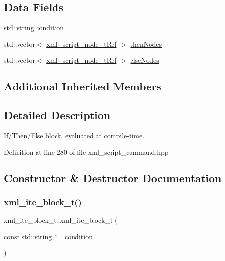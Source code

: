 \subsection*{Data Fields}
\begin{DoxyCompactItemize}
\item 
std\+::string \hyperlink{classxml__ite__block__t_ad7d8d5a0321dac3cc6e74e55411665f2}{condition}
\item 
std\+::vector$<$ \hyperlink{xml__script__command_8hpp_a1fe3d50ade66bc35e41be9b68bbbcd02}{xml\+\_\+script\+\_\+node\+\_\+t\+Ref} $>$ \hyperlink{classxml__ite__block__t_add9208d8134ef496e5162efb73f89db3}{then\+Nodes}
\item 
std\+::vector$<$ \hyperlink{xml__script__command_8hpp_a1fe3d50ade66bc35e41be9b68bbbcd02}{xml\+\_\+script\+\_\+node\+\_\+t\+Ref} $>$ \hyperlink{classxml__ite__block__t_a785fdef43d80828f6e2c3424fe8dec46}{else\+Nodes}
\end{DoxyCompactItemize}
\subsection*{Additional Inherited Members}


\subsection{Detailed Description}
If/\+Then/\+Else block, evaluated at compile-\/time. 

Definition at line 280 of file xml\+\_\+script\+\_\+command.\+hpp.



\subsection{Constructor \& Destructor Documentation}
\mbox{\label{classxml__ite__block__t_a57afc4e1f0e0a6aa1b5441c96166f8eb}} 
\subsubsection{\texorpdfstring{xml\+\_\+ite\+\_\+block\+\_\+t()}{xml\_ite\_block\_t()}\hspace{0.1cm}{\footnotesize\ttfamily [1/2]}}
{\footnotesize\ttfamily xml\+\_\+ite\+\_\+block\+\_\+t\+::xml\+\_\+ite\+\_\+block\+\_\+t (\begin{DoxyParamCaption}\item[{const std\+::string $\ast$}]{\+\_\+condition }\end{DoxyParamCaption})\hspace{0.3cm}{\ttfamily [explicit]}}



